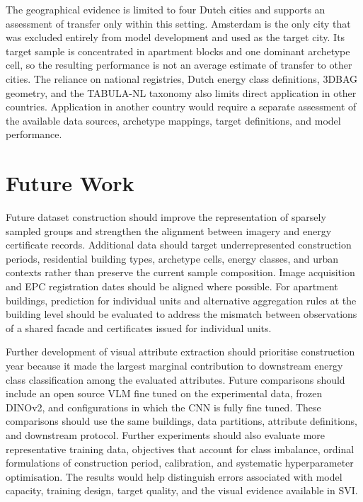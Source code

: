 The geographical evidence is limited to four Dutch cities and supports an assessment of transfer only within this setting.
Amsterdam is the only city that was excluded entirely from model development and used as the target city.
Its target sample is concentrated in apartment blocks and one dominant archetype cell, so the resulting performance is not an average estimate of transfer to other cities.
The reliance on national registries, Dutch energy class definitions, 3DBAG geometry, and the TABULA-NL taxonomy also limits direct application in other countries.
Application in another country would require a separate assessment of the available data sources, archetype mappings, target definitions, and model performance.

\section{Future Work}
\label{sec:future_work}

Future dataset construction should improve the representation of sparsely sampled groups and strengthen the alignment between imagery and energy certificate records.
Additional data should target underrepresented construction periods, residential building types, archetype cells, energy classes, and urban contexts rather than preserve the current sample composition.
Image acquisition and EPC registration dates should be aligned where possible.
For apartment buildings, prediction for individual units and alternative aggregation rules at the building level should be evaluated to address the mismatch between observations of a shared facade and certificates issued for individual units.

Further development of visual attribute extraction should prioritise construction year because it made the largest marginal contribution to downstream energy class classification among the evaluated attributes.
Future comparisons should include an open source \ac{VLM} fine tuned on the experimental data, frozen DINOv2, and configurations in which the \ac{CNN} is fully fine tuned.
These comparisons should use the same buildings, data partitions, attribute definitions, and downstream protocol.
Further experiments should also evaluate more representative training data, objectives that account for class imbalance, ordinal formulations of construction period, calibration, and systematic hyperparameter optimisation.
The results would help distinguish errors associated with model capacity, training design, target quality, and the visual evidence available in \ac{SVI}.

